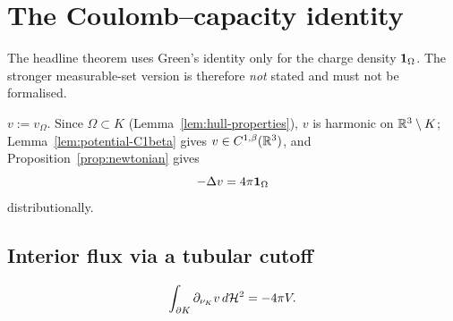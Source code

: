 \chapter{The Coulomb--capacity identity}\label{ch:green}

\begin{remark}\label{rem:green-only-case}
The headline theorem uses Green's identity only for the charge density
$\mathbf 1_{\Omega}$.  The stronger measurable-set version is therefore \emph{not}
stated and must not be formalised.
\end{remark}

\begin{notation}\label{not:v-omega}
$v:=v_\Omega$.  Since $\Omega\subset K$
(Lemma~\ref{lem:hull-properties}), $v$ is harmonic on $\mathbb R^3\setminus K$;
Lemma~\ref{lem:potential-C1beta} gives $v\in C^{1,\beta}(\mathbb R^3)$, and
Proposition~\ref{prop:newtonian} gives
\begin{equation}\label{eq:newtonian-omega}
  -\Delta v=4\pi\mathbf 1_{\Omega}
\end{equation}
distributionally.
\end{notation}

\section{Interior flux via a tubular cutoff}\label{sec:green}

\begin{lemma}\label{lem:interior-flux}
\begin{equation}\label{eq:interior-flux}
  \int_{\partial K}\partial_{\nu_K}v\,d\mathcal H^2=-4\pi V .
\end{equation}
\end{lemma}

